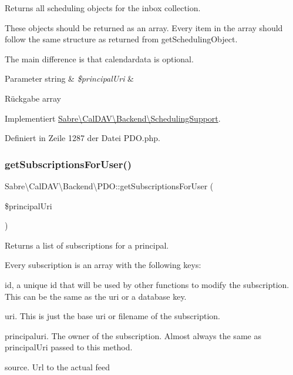 Returns all scheduling objects for the inbox collection.

These objects should be returned as an array. Every item in the array should follow the same structure as returned from get\+Scheduling\+Object.

The main difference is that \textquotesingle{}calendardata\textquotesingle{} is optional.


\begin{DoxyParams}[1]{Parameter}
string & {\em \$principal\+Uri} & \\
\hline
\end{DoxyParams}
\begin{DoxyReturn}{Rückgabe}
array 
\end{DoxyReturn}


Implementiert \mbox{\hyperlink{interface_sabre_1_1_cal_d_a_v_1_1_backend_1_1_scheduling_support_afdf40c6b8b703d1b2ffccb74106b4457}{Sabre\textbackslash{}\+Cal\+D\+A\+V\textbackslash{}\+Backend\textbackslash{}\+Scheduling\+Support}}.



Definiert in Zeile 1287 der Datei P\+D\+O.\+php.

\mbox{\label{class_sabre_1_1_cal_d_a_v_1_1_backend_1_1_p_d_o_a5bf32ef934dfe8d5fa3aff7a8fa918af}} 
\subsubsection{\texorpdfstring{get\+Subscriptions\+For\+User()}{getSubscriptionsForUser()}}
{\footnotesize\ttfamily Sabre\textbackslash{}\+Cal\+D\+A\+V\textbackslash{}\+Backend\textbackslash{}\+P\+D\+O\+::get\+Subscriptions\+For\+User (\begin{DoxyParamCaption}\item[{}]{\$principal\+Uri }\end{DoxyParamCaption})}

Returns a list of subscriptions for a principal.

Every subscription is an array with the following keys\+:
\begin{DoxyItemize}
\item id, a unique id that will be used by other functions to modify the subscription. This can be the same as the uri or a database key.
\item uri. This is just the \textquotesingle{}base uri\textquotesingle{} or \textquotesingle{}filename\textquotesingle{} of the subscription.
\item principaluri. The owner of the subscription. Almost always the same as principal\+Uri passed to this method.
\item source. Url to the actual feed
\end{DoxyItemize}

